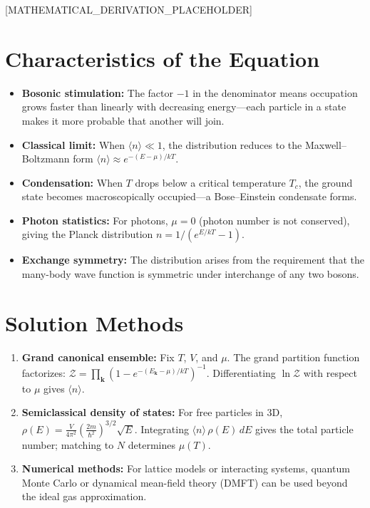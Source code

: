 \documentclass[11pt,openright]{book}
\begin{document}
[MATHEMATICAL_DERIVATION_PLACEHOLDER]

\section*{Characteristics of the Equation}

\begin{itemize}
\item \textbf{Bosonic stimulation:} The factor $-1$ in the denominator means occupation grows faster than linearly with decreasing energy---each particle in a state makes it more probable that another will join.
\item \textbf{Classical limit:} When $\langle n \rangle \ll 1$, the distribution reduces to the Maxwell--Boltzmann form $\langle n \rangle \approx e^{-(E-\mu)/kT}$.
\item \textbf{Condensation:} When $T$ drops below a critical temperature $T_c$, the ground state becomes macroscopically occupied---a Bose--Einstein condensate forms.
\item \textbf{Photon statistics:} For photons, $\mu = 0$ (photon number is not conserved), giving the Planck distribution $n = 1/(e^{E/kT} - 1)$.
\item \textbf{Exchange symmetry:} The distribution arises from the requirement that the many-body wave function is symmetric under interchange of any two bosons.
\end{itemize}
\section*{Solution Methods}

\begin{enumerate}
\item \textbf{Grand canonical ensemble:} Fix $T$, $V$, and $\mu$. The grand partition function factorizes: $\mathcal{Z} = \prod_{\mathbf{k}} (1 - e^{-(E_{\mathbf{k}}-\mu)/kT})^{-1}$. Differentiating $\ln \mathcal{Z}$ with respect to $\mu$ gives $\langle n \rangle$.
\item \textbf{Semiclassical density of states:} For free particles in 3D, $\rho(E) = \frac{V}{4\pi^2}\left(\frac{2m}{\hbar^2}\right)^{3/2} \sqrt{E}$. Integrating $\langle n \rangle \, \rho(E) \, dE$ gives the total particle number; matching to $N$ determines $\mu(T)$.
\item \textbf{Numerical methods:} For lattice models or interacting systems, quantum Monte Carlo or dynamical mean-field theory (DMFT) can be used beyond the ideal gas approximation.
\end{enumerate}
\end{document}
